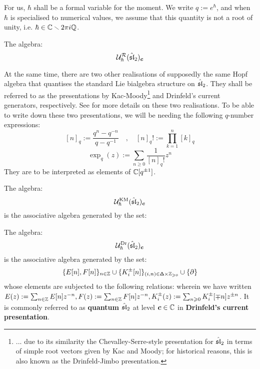         For us, $\hbar$ shall be a formal variable for the moment. We write $q := e^{\hbar}$, and when $\hbar$ is specialised to numerical values, we assume that this quantity is not a root of unity, i.e. $\hbar \in \bbC \setminus 2\pi i \Q$.
        
        \begin{definition} \label{def: quantum_affine_sl_2_R_matrix_presentation}
            The algebra:
                $$\calU_{\hbar}^{\calR}(\hat{\sl}_2)_{\level}$$
        \end{definition}

        At the same time, there are two other realisations of supposedly the same Hopf algebra that quantises the standard Lie bialgebra structure on $\hat{\sl}_2$. They shall be referred to as the presentations by Kac-Moody\footnote{... due to its similarity the Chevalley-Serre-style presentation for $\hat{\sl}_2$ in terms of simple root vectors given by Kac and Moody; for historical reasons, this is also known as the Drinfeld-Jimbo presentation.} and Drinfeld's current generators, respectively. See \cite[Subsection 2.1]{ding_pakuliak_khoroshkin_factorisation_of_the_R_matrix_of_quantum_affine_sl_2} for more details on these two realisations. To be able to write down these two presentations, we will be needing the following $q$-number expressions:
            $$[n]_q := \frac{q^n - q^{-n}}{q - q^{-1}} \quad, \quad [n]_q! := \prod_{k = 1}^n [k]_q$$
            $$\exp_q(z) := \sum_{n \geq 0} \frac{1}{[n]_q!} z^n$$
        They are to be interpreted as elements of $\bbC[q^{\pm 1}]$.
        \begin{definition} \label{def: quantum_affine_sl_2_kac_moody_presentation}
            The algebra:
                $$\calU_{\hbar}^{\KM}(\hat{\sl}_2)_{\level}$$
            is the associative algebra generated by the set:
                $$$$
        \end{definition}
        \begin{definition} \label{def: quantum_affine_sl_2_drinfeld_current_presentation}
            The algebra:
                $$\calU_{\hbar}^{\current}(\hat{\sl}_2)_{\level}$$
            is the associative algebra generated by the set:
                $$\{ E[n], F[n] \}_{n \in \Z} \cup \{ K_i^{\pm}[n] \}_{(i, n) \in \simpleroots \x \Z_{\geq 0}} \cup \{ \del \}$$
            whose elements are subjected to the following relations:
            wherein we have written $E(z) := \sum_{n \in \Z} E[n] z^{-n}, F(z) := \sum_{n \in \Z} F[n] z^{-n}, K_i^{\pm}(z) := \sum_{n \geq 0} K_i^{\pm}[\mp n] z^{\pm n}$. It is commonly referred to as \textbf{quantum $\hat{\sl}_2$} at level $\level \in \bbC$ in \textbf{Drinfeld's current presentation}.
        \end{definition}

